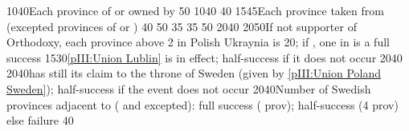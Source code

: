 %
%
%
%
{10}{40}{Each province of \paysgeorgie or \paysperse owned by
  \paysmajeurRussie}%
%
{}{50}{}%
%
{10}{40}{}%
%
{}{40}{}%
%
{15}{45}{Each province taken from \paysmajeurTurquie (excepted provinces of
  \paysgeorgie or \paysperse)}%
%
%
%
%
{}{40}{}%
%
{}{50}{}%
%
{}{35}{}%
%
{}{35}{}%
%
%
%
%
%
{}{50}{}%
%
{20}{40}{\EU@objNoRUSBaltique}%
%
{20}{50}{If not supporter of Orthodoxy, each province above 2 in Polish
  Ukraynia is 20\VPs; if \Xorthodoxe, one \COL in \continentSiberia is a full
  success}%
%
%
%
%
%
{15}{30}{\ref{pIII:Union Lublin} is in effect; half-success if it does not
  occur}%
%
{20}{40}{\EU@objNoRUSBaltique}%
%
{20}{40}{\POL has still its claim to the throne of Sweden (given by
  \ref{pIII:Union Poland Sweden}); half-success if the event does not occur}%
%
%
%
{20}{40}{Number of Swedish provinces adjacent to \regionBaltique (\regionSuede
  and \regionFinlande excepted): full success ( prov);
  half-success (4 prov) else failure}%
%
{}{40}{}%
%
